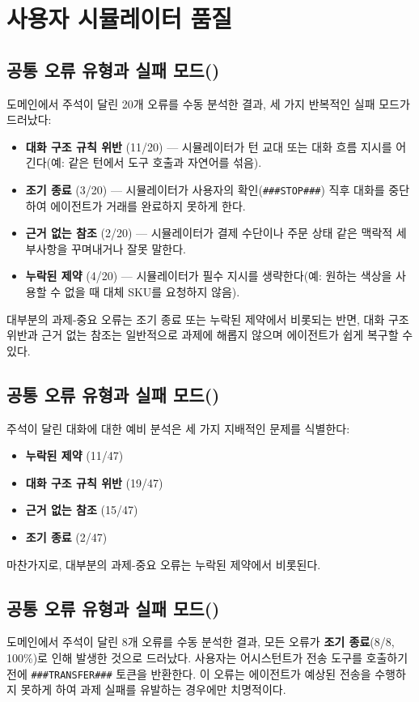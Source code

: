 \section{사용자 시뮬레이터 품질}
\label{app:user-sim-quality}

\subsection{공통 오류 유형과 실패 모드(\retail)}
\retail 도메인에서 주석이 달린 20개 오류를 수동 분석한 결과, 세 가지 반복적인 실패 모드가 드러났다:
\begin{itemize}
    \item \textbf{대화 구조 규칙 위반} (11/20) --- 시뮬레이터가 턴 교대 또는 대화 흐름 지시를 어긴다(예: 같은 턴에서 도구 호출과 자연어를 섞음).
    \item \textbf{조기 종료} (3/20) --- 시뮬레이터가 사용자의 확인(\texttt{\#\#\#STOP\#\#\#}) 직후 대화를 중단하여 에이전트가 거래를 완료하지 못하게 한다.
    \item \textbf{근거 없는 참조} (2/20) --- 시뮬레이터가 결제 수단이나 주문 상태 같은 맥락적 세부사항을 꾸며내거나 잘못 말한다.
    \item \textbf{누락된 제약} (4/20) --- 시뮬레이터가 필수 지시를 생략한다(예: 원하는 색상을 사용할 수 없을 때 대체 SKU를 요청하지 않음).
\end{itemize}
대부분의 과제-중요 오류는 조기 종료 또는 누락된 제약에서 비롯되는 반면, 대화 구조 위반과 근거 없는 참조는 일반적으로 과제에 해롭지 않으며 에이전트가 쉽게 복구할 수 있다.

\subsection{공통 오류 유형과 실패 모드(\airline)}
주석이 달린 \airline 대화에 대한 예비 분석은 세 가지 지배적인 문제를 식별한다:
\begin{itemize}
    \item \textbf{누락된 제약} (11/47)
    \item \textbf{대화 구조 규칙 위반} (19/47)
    \item \textbf{근거 없는 참조} (15/47)
    \item \textbf{조기 종료} (2/47)
\end{itemize}
마찬가지로, 대부분의 과제-중요 오류는 누락된 제약에서 비롯된다. 


\subsection{공통 오류 유형과 실패 모드(\telecom)}
\telecom 도메인에서 주석이 달린 8개 오류를 수동 분석한 결과, 모든 오류가 \textbf{조기 종료}(8/8, 100\%)로 인해 발생한 것으로 드러났다. 사용자는 어시스턴트가 전송 도구를 호출하기 전에 \texttt{\#\#\#TRANSFER\#\#\#} 토큰을 반환한다. 이 오류는 에이전트가 예상된 전송을 수행하지 못하게 하여 과제 실패를 유발하는 경우에만 치명적이다.
    

